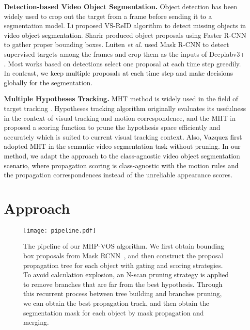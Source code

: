 \documentclass[10pt,twocolumn,letterpaper]{article}
\newcommand{\bao}[1]{\textcolor{black}{#1}}
\newcommand{\ldz}[1]{\textcolor{black}{#1}}
\begin{document}
\textbf{Detection-based Video Object Segmentation.} 
Object detection has been widely used to crop out the target from a frame before sending it to a  segmentation model. Li \etal  \cite{li2017video} proposed VS-ReID algorithm to detect missing objects \bao{in video object segmentation}. Sharir \etal  \cite{sharir2017video} produced object proposals using Faster R-CNN \cite{ren2017faster} to gather proper bounding boxes. Luiten \emph{et al.} \cite{luiten2018premvos} used Mask R-CNN \cite{he2017mask} to detect supervised targets among the frames and crop them as the inputs of Deeplabv3+ \cite{chen2018encoder}. Most works based on detections select one proposal at each time step greedily. In contrast, \bao{we keep multiple proposals at each time step and make decisions globally for the segmentation.} 


\textbf{Multiple Hypotheses Tracking.} MHT method is widely used in the field of target tracking \cite{blackman1999design, blackman2004multiple}. Hypotheses tracking \cite{Cox1996An} algorithm originally evaluates its usefulness in the context of visual tracking and motion correspondence, and the MHT in \cite{kim2015multiple} proposed a scoring function to prune the hypothesis space efficiently and accurately which is suited to current visual tracking context.
\ldz{Also, Vazquez \etal \cite{vazquez2010multiple} first adopted MHT in the semantic video segmentation task without pruning.}
\bao{In our method, we adapt the approach to the class-agnostic video object segmentation scenario}, where propagation scoring is class-agnostic with the motion rules and the propagation correspondences instead of the unreliable appearance scores.










\section{Approach}

\begin{figure*}[t]
\vspace{-10pt}
\centering
\texttt{[image: pipeline.pdf]}
\caption{The pipeline of our MHP-VOS algorithm. We first obtain bounding box proposals from Mask RCNN~\cite{he2017mask}, and then construct the proposal propagation tree for each object with gating and scoring strategies. To avoid calculation explosion, an N-scan pruning strategy is applied to remove branches that are far from the best hypothesis. Through this recurrent process between tree building and branches pruning, we can obtain the best propagation track, and then obtain the segmentation mask for each object by mask propagation and merging.}
\label{fig:pipeline}
\vspace{-10pt}
\end{figure*}
\end{document}
